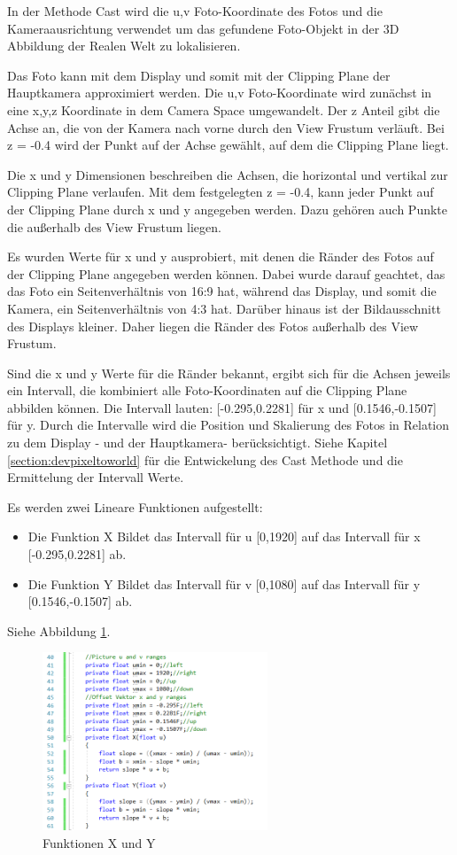 \documentclass[german,a4paper, 12pt]{llncs}
\begin{document}
In der Methode Cast wird die u,v Foto-Koordinate des Fotos und die Kameraausrichtung verwendet um das gefundene Foto-Objekt in der 3D Abbildung der Realen Welt zu lokalisieren.

Das Foto kann mit dem Display und somit mit der Clipping Plane der Hauptkamera approximiert werden.
Die u,v Foto-Koordinate wird zunächst in eine x,y,z Koordinate in dem Camera Space umgewandelt. Der z Anteil gibt die Achse an, die von der Kamera nach vorne durch den View Frustum verläuft. Bei z = -0.4 wird der Punkt auf der Achse gewählt, auf dem die Clipping Plane liegt. 

Die x und y Dimensionen beschreiben die Achsen, die horizontal und vertikal zur Clipping Plane verlaufen. Mit dem festgelegten z = -0.4, kann jeder Punkt auf der Clipping Plane durch x und y angegeben werden. Dazu gehören auch Punkte die außerhalb des View Frustum liegen.

Es wurden Werte für x und y ausprobiert, mit denen die Ränder des Fotos auf der Clipping Plane angegeben werden können. Dabei wurde darauf geachtet, das das Foto ein Seitenverhältnis von 16:9 hat, während das Display, und somit die Kamera, ein Seitenverhältnis von 4:3 hat. Darüber hinaus ist der Bildausschnitt des Displays kleiner. Daher liegen die Ränder des Fotos außerhalb des View Frustum. 

Sind die x und y Werte für die Ränder bekannt, ergibt sich für die Achsen jeweils ein Intervall, die kombiniert alle Foto-Koordinaten auf die Clipping Plane abbilden können. Die Intervall lauten: [-0.295,0.2281] für x und [0.1546,-0.1507] für y. Durch die Intervalle wird die Position und Skalierung des Fotos in Relation zu dem Display - und der Hauptkamera- berücksichtigt. Siehe Kapitel \ref{section:devpixeltoworld} für die Entwickelung des Cast Methode und die Ermittelung der Intervall Werte.

Es werden zwei Lineare Funktionen aufgestellt:
\begin{itemize}
	\item Die Funktion X Bildet das Intervall für u [0,1920] auf das Intervall für x [-0.295,0.2281] ab.
	\item Die Funktion Y Bildet das Intervall für v [0,1080] auf das Intervall für y [0.1546,-0.1507] ab.
\end{itemize}
Siehe Abbildung \ref{code:uvtoxy}.
\begin{figure}[H]
	\centering
	\includegraphics[width=0.6\textwidth]{images/code_uv_to_xy_scale.PNG}
	\caption[]{Funktionen X und Y}
	\label{code:uvtoxy}
\end{figure}
\end{document}
